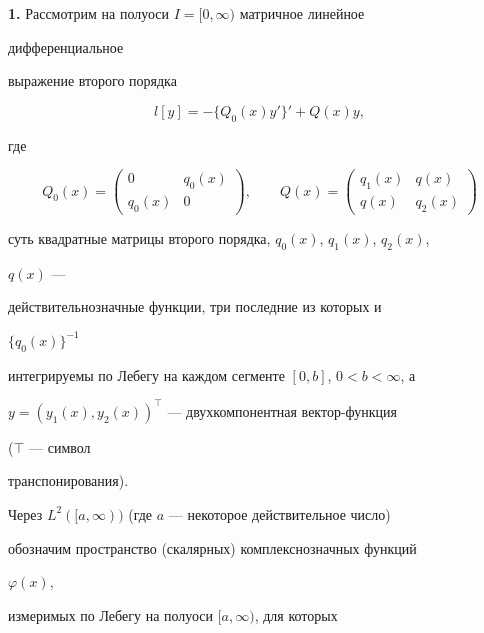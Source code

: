 \label{begin} 


 


{\bf 1.} Рассмотрим на полуоси $I=[0,\infty)$ матричное линейное 


дифференциальное 


выражение второго порядка 


\begin{equation} 


l[y]=-\{Q_0(x)y'\}'+Q(x)y, 


\end{equation} 


где 


$$ 


Q_0(x)= 


\begin{pmatrix} 


0 & q_0(x) \\ q_0(x) & 0 


\end{pmatrix} 


,\qquad 


Q(x)= 


\begin{pmatrix} 


q_1(x) & q(x) \\ q(x) & q_2(x) 


\end{pmatrix} 


$$ 


суть квадратные матрицы второго порядка, $q_0(x)$, $q_1(x)$, $q_2(x)$, 


$q(x)$ --- 


действительнозначные функции, три последние из которых и 


$\{q_0(x)\}^{-1}$ 


интегрируемы по Лебегу на каждом сегменте $[0,b]$, $0<b<\infty$, а 


$y=(y_1(x),y_2(x))^\top$ --- двухкомпонентная вектор-функция 


($\scriptstyle\top$ --- символ 


транспонирования). 


 


Через $L^2([a,\infty))$ (где $a$ --- некоторое действительное число) 


обозначим пространство (скалярных) комплекснозначных функций 


$\varphi(x)$, 


измеримых по Лебегу на полуоси $[a,\infty)$, для которых 


